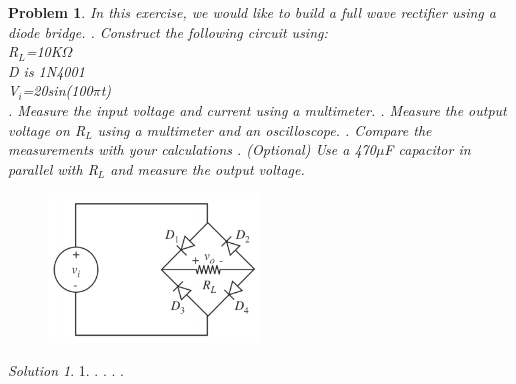 \documentclass[11pt,a4paper,notitlepage]{article}
\theoremstyle{plain}
\newtheorem{problem}{Problem}[section]
\theoremstyle{remark}
\newtheorem*{solution}{Solution}
\begin{document}
{{{	\begin{problem}
		In this exercise, we would like to build a full wave rectifier using a diode bridge.
		. Construct the following circuit using:\\
		R\(_{L}\)=10K\(\Omega\)\\
		D is 1N4001\\
		V\(_{i}\)=20sin(100\(\pi\)t)\\
		. Measure the input voltage and current using a multimeter.
		. Measure the output voltage on R\(_{L}\) using a multimeter and an oscilloscope.
		. Compare the measurements with your calculations
		. (Optional) Use a 470\(\mu\)F capacitor in parallel with R\(_{L}\) and measure the output voltage.
		\begin{figure}[h!]
			\centering
			\includegraphics[width=0.5\textwidth]{images/circuit2.png}
		\end{figure}
	\end{problem}
	
	\begin{solution}
		1.
		.
		.
		.
		.
	\end{solution}
	
}}}
\end{document}
